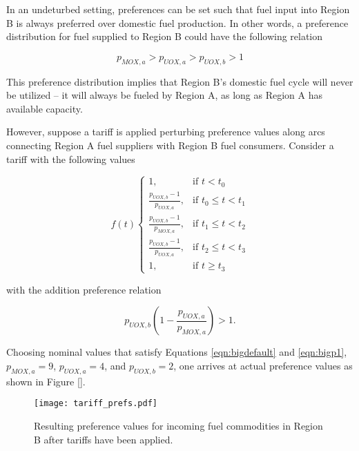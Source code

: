 In an undeturbed setting, preferences can be set such that fuel input into
Region B is always preferred over domestic fuel production. In other words, a
preference distribution for fuel supplied to Region B could have the following
relation

\begin{equation}\label{eqn:bigdefault}
  p_{MOX, a} > p_{UOX, a} > p_{UOX, b} > 1
\end{equation}

This preference distribution implies that Region B's domestic fuel cycle will
never be utilized -- it will always be fueled by Region A, as long as Region A
has available capacity.

However, suppose a tariff is applied perturbing preference values along arcs
connecting Region A fuel suppliers with Region B fuel consumers. Consider a
tariff with the following values

\begin{equation}
f(t)
\begin{cases}
1, & \text{if } t < t_0 \\
\frac{p_{UOX, b} - 1}{p_{UOX, a}}, & \text{if } t_0 \leq t < t_1 \\
\frac{p_{UOX, b} - 1}{p_{MOX, a}}, & \text{if } t_1 \leq t < t_2 \\
\frac{p_{UOX, b} - 1}{p_{UOX, a}}, & \text{if } t_2 \leq t < t_3 \\
1, & \text{if } t \geq t_3
\end{cases} 
\end{equation}

with the addition preference relation

\begin{equation}\label{eqn:bigp1}
  p_{UOX, b} \left( 1 - \frac{p_{UOX, a}}{p_{MOX, a}} \right) > 1.
\end{equation}

Choosing nominal values that satisfy Equations \ref{eqn:bigdefault} and
\ref{eqn:bigp1}, $p_{MOX, a} = 9$, $p_{UOX, a} = 4$, and $p_{UOX, b} = 2$, one
arrives at actual preference values as shown in Figure \ref{}.


\begin{figure}
  \begin{center}
    \texttt{[image: tariff\_prefs.pdf]}
    \caption[]{
      \label{fig:prefs}
      Resulting preference values for incoming fuel commodities in Region B
      after tariffs have been applied.}
  \end{center}
\end{figure}





